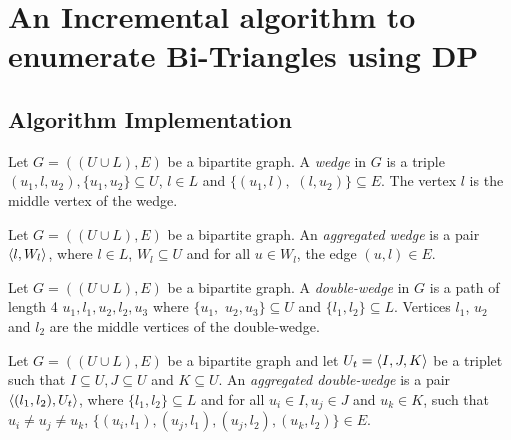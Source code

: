 \chapter{An Incremental algorithm to enumerate Bi-Triangles using DP}
\section{Algorithm Implementation}

\begin{definition}[Wedge]
Let $G=((U\cup L),E)$ be a bipartite graph. A  \textit{wedge} in $G$ is a triple $(u_1,l,u_2), \{u_1,u_2\}\subseteq U$, $l \in L$ and $\{(u_1,l),$ $(l,u_2)\} \subseteq E$. The vertex $l$ is the middle vertex of the wedge. 
\end{definition}
%   
\begin{definition}
Let $G=((U\cup L),E)$ be a bipartite graph. An  \textit{aggregated wedge} is a pair $\left\langle l, W_l \right\rangle$, where $l \in L$, $W_l \subseteq U$ and for all $u\in W_l$, the edge  $(u,l)\in E$. 
\end{definition}
%
\begin{definition}
Let $G=((U\cup L),E)$ be a bipartite graph. A \textit{double-wedge} in $G$ is a path of length 4 $u_1,l_1,u_2,l_2,u_3$ where  $\{u_1,$ $u_2,u_3\}\subseteq U$ and $\{l_1,l_2\}\subseteq L$. Vertices $l_1$, $u_2$ and $l_2$ are the middle vertices of the double-wedge. 
\end{definition}
%  
\begin{definition}
Let $G=((U\cup L),E)$ be a bipartite graph and let $U_t = \left\langle I, J, K\right\rangle$ be a triplet such that $I \subseteq U, J \subseteq U$ and $K \subseteq U$.  An \textit{aggregated double-wedge}  is a pair  $\left\langle (l_1, l_2), U_t \right\rangle$, where $\{l_1,l_2\}\subseteq L$ and  for all $u_i \in I, u_j \in J$ and $u_k \in K$, such that $u_i \neq u_j \neq u_k$, $\{(u_i, l_1), (u_j, l_1), (u_j, l_2), (u_k, l_2)\} \in E$.
\end{definition}
%
